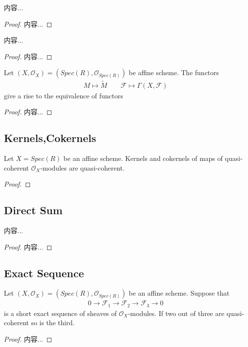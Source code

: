 \documentclass[Total.tex]{subfiles}
\begin{document}
			\begin{lemma}
				内容...
			\end{lemma}
			\begin{proof}
				内容...
			\end{proof}
			
			\begin{lemma}
				内容...
			\end{lemma}
			\begin{proof}
				内容...
			\end{proof}
			
			\begin{theorem}
				Let $(X,\mathcal{O}_X)=(Spec(R),\mathcal{O}_{Spec(R)})$ be affine scheme. The functors
				\begin{gather*}
					M\mapsto \tilde{M}\qquad \mathcal{F}\mapsto \Gamma(X,\mathcal{F})
				\end{gather*}
				give a rise to the equivalence of functors
				\begin{center}
				\end{center}
			\end{theorem}
			\begin{proof}
				内容...
			\end{proof}
			\subsection{Kernels,Cokernels}
			\begin{lemma}
				Let $X=Spec(R)$ be an affine scheme. Kernels and cokernels of maps of quasi-coherent $\mathcal{O}_X$-modules are quasi-coherent.
			\end{lemma}
			\begin{proof}
				
			\end{proof}
			\subsection{Direct Sum}
			\begin{lemma}
				内容...
			\end{lemma}
			\begin{proof}
				内容...
			\end{proof}
			\subsection{Exact Sequence}
				\begin{lemma}
				Let $(X,\mathcal{O}_X)=(Spec(R),\mathcal{O}_{Spec(R)})$ be an affine scheme. Suppose that
				\begin{gather*}
					0\rightarrow\mathcal{F}_1\rightarrow \mathcal{F}_2\rightarrow \mathcal{F}_3\rightarrow 0
				\end{gather*}
				is a short exact sequence of sheaves of $\mathcal{O}_X$-modules. If two out of three are quasi-coherent so is the third.
			\end{lemma}
			\begin{proof}
				内容...
			\end{proof}
\end{document}
